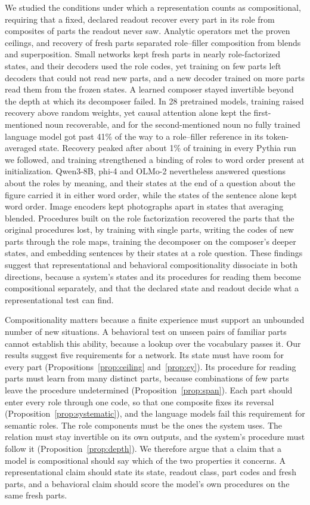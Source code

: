 \documentclass[10pt]{article}
\theoremstyle{plain}
\theoremstyle{remark}
\begin{document}
We studied the conditions under which a representation counts as compositional, requiring that a fixed, declared readout recover every part in its role from composites of parts the readout never saw. Analytic operators met the proven ceilings, and recovery of fresh parts separated role--filler composition from blends and superposition. Small networks kept fresh parts in nearly role-factorized states, and their decoders used the role codes, yet training on few parts left decoders that could not read new parts, and a new decoder trained on more parts read them from the frozen states. A learned composer stayed invertible beyond the depth at which its decomposer failed. In 28 pretrained models, training raised recovery above random weights, yet causal attention alone kept the first-mentioned noun recoverable, and for the second-mentioned noun no fully trained language model got past 41\% of the way to a role--filler reference in its token-averaged state. Recovery peaked after about 1\% of training in every Pythia run we followed, and training strengthened a binding of roles to word order present at initialization. Qwen3-8B, phi-4 and OLMo-2 nevertheless answered questions about the roles by meaning, and their states at the end of a question about the figure carried it in either word order, while the states of the sentence alone kept word order. Image encoders kept photographs apart in states that averaging blended. Procedures built on the role factorization recovered the parts that the original procedures lost, by training with single parts, writing the codes of new parts through the role maps, training the decomposer on the composer's deeper states, and embedding sentences by their states at a role question. These findings suggest that representational and behavioral compositionality dissociate in both directions, because a system's states and its procedures for reading them become compositional separately, and that the declared state and readout decide what a representational test can find.

Compositionality matters because a finite experience must support an unbounded number of new situations. A behavioral test on unseen pairs of familiar parts cannot establish this ability, because a lookup over the vocabulary passes it. Our results suggest five requirements for a network. Its state must have room for every part (Propositions~\ref{prop:ceiling} and~\ref{prop:ey}). Its procedure for reading parts must learn from many distinct parts, because combinations of few parts leave the procedure undetermined (Proposition~\ref{prop:span}). Each part should enter every role through one code, so that one composite fixes its reversal (Proposition~\ref{prop:systematic}), and the language models fail this requirement for semantic roles. The role components must be the ones the system uses. The relation must stay invertible on its own outputs, and the system's procedure must follow it (Proposition~\ref{prop:depth}). We therefore argue that a claim that a model is compositional should say which of the two properties it concerns. A representational claim should state its state, readout class, part codes and fresh parts, and a behavioral claim should score the model's own procedures on the same fresh parts.
\end{document}
